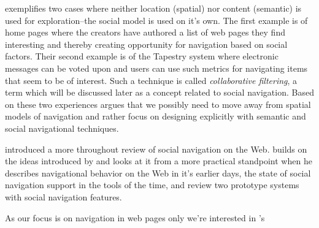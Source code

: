 \citeauthor{dourish94} exemplifies two cases where neither location
(spatial) nor content (semantic) is used for exploration--the social model
is used on it's own. The first example is of home pages where the creators
have authored a list of web pages they find interesting and thereby creating
opportunity for navigation based on social factors. Their second example
is of the Tapestry \citep{goldberg92} system where electronic messages can be
voted upon and users can use such metrics for navigating items that seem to be
of interest. Such a technique is called \emph{collaborative filtering},
a term which will be discussed later as a concept related to social
navigation. Based on these two experiences \citeauthor{dourish94} argues that
we possibly need to move away from spatial models of navigation and rather
focus on designing explicitly with semantic and social navigational
techniques.

\citet{dieberger97} introduced a more throughout review of social navigation
on the Web. \citeauthor{dieberger97} builds on the ideas introduced by
\citeauthor{dourish94} and looks at it from a more practical standpoint when
he describes navigational behavior on the Web in it's earlier days, the state
of social navigation support in the tools of the time, and review two
prototype systems with social navigation features.

As our focus is on navigation in web pages only we're interested in
\citeauthor{dieberger97}'s

